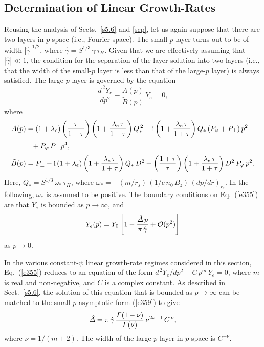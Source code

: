 \documentclass[12pt,prb,aps]{revtex4-1}
\begin{document}
\subsection{Determination of Linear Growth-Rates}\label{s6.3}
Reusing the analysis of Sects.~\ref{s5.6} and \ref{scp}, let us again suppose that there are two layers in $p$ space (i.e., Fourier space). The
small-$p$ layer turns out to be of width $|\hat{\gamma}|^{1/2}$, where $\hat{\gamma} = S^{1/3}\,\gamma\,\tau_H$. Given that we are effectively assuming that
$|\hat{\gamma}|\ll 1$, the condition for the separation of the layer solution into two layers (i.e., that the width of the small-$p$ layer is less than that of the large-$p$ layer) is always satisfied. The large-$p$ layer is governed by the equation
\begin{equation}\label{e355}
\frac{d^{\,2} Y_e}{dp^2} - \frac{A(p)}{\tilde{B}(p)} \,Y_e =0,
\end{equation}
where 
\begin{align}
A(p) &= (1+\lambda_e)\left(\frac{\tau}{1+\tau}\right)\left(1+ \frac{\lambda_e\,\tau}{1+\tau}\right)Q_\ast^{\,2}
-{\rm i}\left(1+\frac{\lambda_e\,\tau}{1+\tau}\right)Q_\ast\,(P_\varphi+P_\perp)\,p^2\nonumber\\[0.5ex]
&\phantom{=} + P_\varphi\,P_\perp\,p^4,\\[0.5ex]
\tilde{B}(p)&= P_\perp - {\rm i}\,(1+\lambda_e)\left(1+\frac{\lambda_e\,\tau}{1+\tau}\right)Q_\ast\,D^2 +\left(\frac{1+\tau}{\tau}\right)\left(1+\frac{\lambda_e\,\tau}{1+\tau}\right) D^2\,P_\varphi\,p^2.
\end{align}
Here, $Q_\ast = S^{1/3}\,\omega_\ast\,\tau_H$, where
$\omega_\ast =-(m/r_s)\,(1/e\,n_0\,B_z)\,(dp/dr)_{r_s}$.
In the following, $\omega_\ast$ is assumed to be positive. The boundary conditions on Eq.~(\ref{e355}) are
that $Y_e$ is bounded as $p\rightarrow\infty$, and
\begin{equation}\label{e359}
Y_e(p)= Y_0\left[1-\frac{\hat{\mit\Delta}\,p}{\pi\,\hat{\gamma}} + {\cal O}(p^2)\right]
\end{equation}
as $p\rightarrow 0$. 

In the various constant-$\psi$ linear growth-rate regimes considered in this section, Eq.~(\ref{e355}) reduces to an equation of the form
$d^{\,2} Y_e/dp^2 - C\,p^m\,Y_e = 0$,
where $m$ is real and non-negative, and $C$ is a complex constant. As described in Sect.~\ref{s5.6}, the solution of this
equation that is bounded as $p\rightarrow \infty$ can be matched to the small-$p$ asymptotic form (\ref{e359}) to give 
\begin{equation}
\hat{\mit\Delta} = \pi\,\hat{\gamma}\,\frac{{\mit\Gamma}(1-\nu)}{{\mit\Gamma}(\nu)}\,\nu^{2\nu-1}\,C^{\,\nu},
\end{equation}
where $\nu=1/(m+2)$. The width of the large-$p$ layer in $p$ space is $C^{-\nu}$. 
\end{document}
